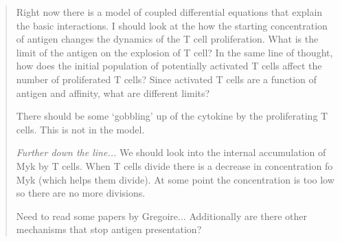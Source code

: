 \begin{quotation}
Right now there is a model of coupled differential equations that explain the basic interactions. I should look at the how the starting concentration of antigen changes the dynamics of the T cell proliferation. What is the limit of the antigen on the explosion of T cell? In the same line of thought, how does the initial population of potentially activated T cells affect the number of proliferated T cells? Since activated T cells are a function of antigen and affinity, what are different limits?

There should be some `gobbling' up of the cytokine by the proliferating T cells. This is not in the model.

\textit{Further down the line...} We should look into the internal accumulation of Myk by T cells. When T cells divide there is a decrease in concentration fo Myk (which helps them divide). At some point the concentration is too low so there are no more divisions.

Need to read some papers by Gregoire...
Additionally are there other mechanisms that stop antigen presentation?
\end{quotation}
